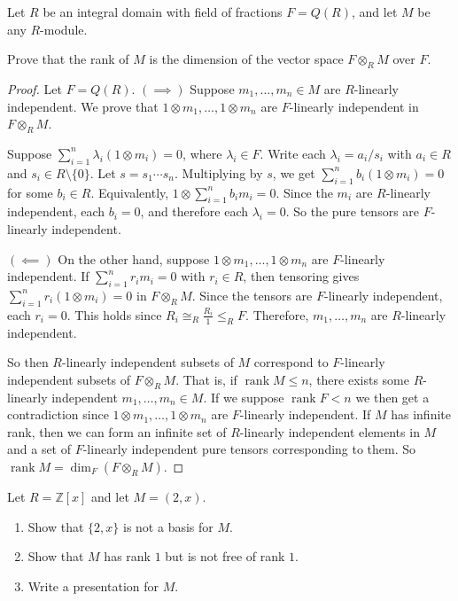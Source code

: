 \documentclass[addpoints,10pt]{exam}
\theoremstyle{plain}
\theoremstyle{definition}
\newtheorem{prob}[thm]{Problem}
\theoremstyle{plain}
\theoremstyle{plain}
\theoremstyle{definition}
\let\oldprob\prob
\let\endoldprob\endprob
\renewenvironment{prob}
  {\begin{singlespace}\oldprob}
  {\endoldprob\end{singlespace}}
\newcommand{\ZZ}{\ensuremath{\mathbb{Z}}}
\newcommand{\rank}{\ensuremath{\operatorname{rank}}}
\begin{document}
\begin{prob}
Let $R$ be an integral domain with field of fractions $F=Q(R)$, and let
$M$ be any $R$-module.

Prove that the rank of $M$ is the dimension of the vector space
$F\otimes_R M$ over $F$.
\end{prob}

\begin{proof}
Let $F=Q(R)$. $(\implies)$ Suppose $m_1,\ldots,m_n\in M$ are $R$-linearly independent.
We prove that $1\otimes m_1,\ldots,1\otimes m_n$ are $F$-linearly
independent in $F\otimes_R M$.

Suppose $\sum_{i=1}^n \lambda_i(1\otimes m_i)=0$, where
$\lambda_i\in F$. Write each $\lambda_i=a_i/s_i$ with $a_i\in R$ and
$s_i\in R\setminus\{0\}$. Let $s=s_1\cdots s_n$. Multiplying by $s$,
we get $\sum_{i=1}^n b_i(1\otimes m_i)=0$ for some $b_i\in R$.
Equivalently, $1\otimes \sum_{i=1}^n b_i m_i=0$. Since the $m_i$ are
$R$-linearly independent, each $b_i=0$, and therefore each
$\lambda_i=0$. So the pure tensors are $F$-linearly independent.

$(\impliedby)$ On the other hand, suppose $1\otimes m_1,\ldots,1\otimes m_n$ are
$F$-linearly independent. If $\sum_{i=1}^n r_i m_i=0$ with $r_i\in R$,
then tensoring gives $\sum_{i=1}^n r_i(1\otimes m_i)=0$ in
$F\otimes_R M$. Since the tensors are $F$-linearly independent, each
$r_i=0$. This holds since $R_{i}\cong_{R}\frac{R_{i}}{1}\leq_{R} F$. Therefore, $m_1,\ldots,m_n$ are $R$-linearly independent.

So then $R$-linearly independent subsets of $M$ correspond to
$F$-linearly independent subsets of $F\otimes_R M$. That is, if $\rank M\leq n$, there exists some $R$-linearly independent $m_{1},\hdots, m_{n}\in M$. If we suppose $\rank F<n$ we then get a contradiction since $1\otimes m_{1},\hdots, 1\otimes m_{n}$ are $F$-linearly independent. If $M$ has infinite rank, then we can form an infinite set of $R$-linearly independent elements in $M$ and a set of $F$-linearly independent pure tensors corresponding to them. So $\rank M=\dim_{F}(F\otimes_{R} M).$
\end{proof}


\newpage

\begin{prob}
Let $R=\ZZ[x]$ and let $M=(2,x)$.

\begin{enumerate}[label=(\alph*)]
\item Show that $\{2,x\}$ is not a basis for $M$.

\item Show that $M$ has rank $1$ but is not free of rank $1$.

\item Write a presentation for $M$.
\end{enumerate}
\end{prob}
\end{document}
